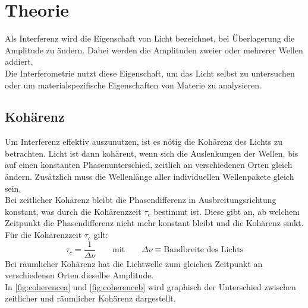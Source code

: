 \section{Theorie}
\label{sec:theorie}

Als Interferenz wird die Eigenschaft von Licht bezeichnet, bei Überlagerung die Amplitude zu ändern.
Dabei werden die Amplituden zweier oder mehrerer Wellen addiert.\\
Die Interferometrie nutzt diese Eigenschaft, um das Licht selbst zu untersuchen oder um materialspezifische Eigenschaften von Materie zu analysieren.

\subsection{Kohärenz}
Um Interferenz effektiv auszunutzen, ist es nötig die Kohärenz des Lichts zu betrachten.
Licht ist dann kohärent, wenn sich die Auslenkungen der Wellen, bis auf einen konstanten Phasenunterschied, zeitlich an verschiedenen Orten gleich ändern.
Zusätzlich muss die Wellenlänge aller individuellen Wellenpakete gleich sein.\\
\newline
Bei zeitlicher Kohärenz bleibt die Phasendifferenz in Ausbreitungsrichtung konstant, was durch die Kohärenzzeit $\tau_c$ bestimmt ist.
Diese gibt an, ab welchem Zeitpunkt die Phasendifferenz nicht mehr konstant bleibt und die Kohärenz sinkt.
Für die Kohärenzzeit $\tau_c$ gilt:
\begin{equation}
    \tau_c = \frac{1}{\Delta \nu} \qquad \text{mit} \qquad \Delta \nu \equiv \text{Bandbreite des Lichts}
\end{equation}
\newline
Bei räumlicher Kohärenz hat die Lichtwelle zum gleichen Zeitpunkt an verschiedenen Orten dieselbe Amplitude.\\
In \autoref{fig:coherencea} und \ref{fig:coherenceb} wird graphisch der Unterschied zwischen zeitlicher und räumlicher Kohärenz dargestellt.


